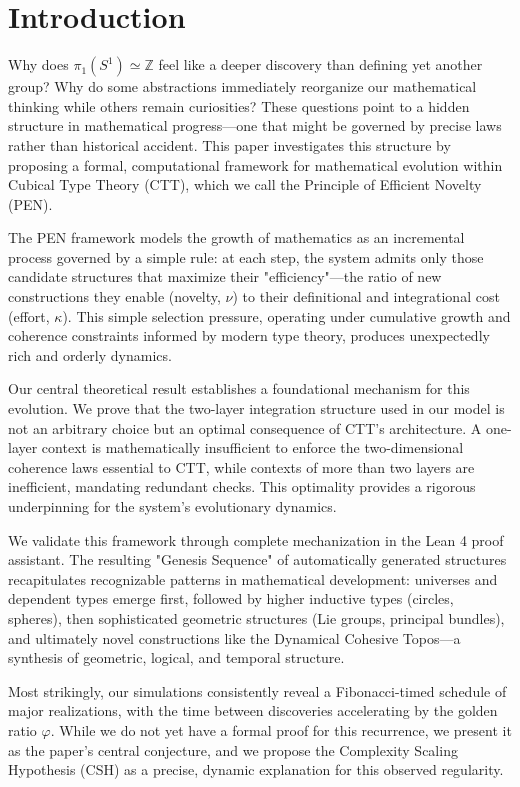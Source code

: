 \documentclass[11pt]{article}
\theoremstyle{definition}
\theoremstyle{plain}
\theoremstyle{remark}
\begin{document}
\section{Introduction}
Why does $\pi_1(S^1) \simeq \mathbb{Z}$ feel like a deeper discovery than defining yet another group? Why do some abstractions immediately reorganize our mathematical thinking while others remain curiosities? These questions point to a hidden structure in mathematical progress—one that might be governed by precise laws rather than historical accident. This paper investigates this structure by proposing a formal, computational framework for mathematical evolution within Cubical Type Theory (CTT), which we call the Principle of Efficient Novelty (PEN).

The PEN framework models the growth of mathematics as an incremental process governed by a simple rule: at each step, the system admits only those candidate structures that maximize their "efficiency"—the ratio of new constructions they enable (novelty, $\nu$) to their definitional and integrational cost (effort, $\kappa$). This simple selection pressure, operating under cumulative growth and coherence constraints informed by modern type theory, produces unexpectedly rich and orderly dynamics.

Our central theoretical result establishes a foundational mechanism for this evolution. We prove that the two-layer integration structure used in our model is not an arbitrary choice but an optimal consequence of CTT's architecture. A one-layer context is mathematically insufficient to enforce the two-dimensional coherence laws essential to CTT, while contexts of more than two layers are inefficient, mandating redundant checks. This optimality provides a rigorous underpinning for the system's evolutionary dynamics.

We validate this framework through complete mechanization in the Lean 4 proof assistant. The resulting "Genesis Sequence" of automatically generated structures recapitulates recognizable patterns in mathematical development: universes and dependent types emerge first, followed by higher inductive types (circles, spheres), then sophisticated geometric structures (Lie groups, principal bundles), and ultimately novel constructions like the Dynamical Cohesive Topos—a synthesis of geometric, logical, and temporal structure.

Most strikingly, our simulations consistently reveal a Fibonacci-timed schedule of major realizations, with the time between discoveries accelerating by the golden ratio $\varphi$. While we do not yet have a formal proof for this recurrence, we present it as the paper's central conjecture, and we propose the Complexity Scaling Hypothesis (CSH) as a precise, dynamic explanation for this observed regularity.
\end{document}
